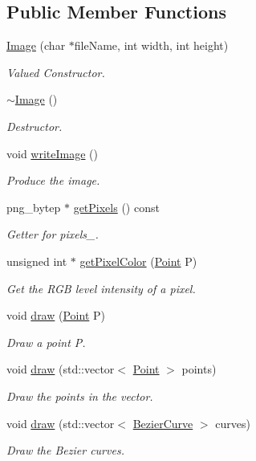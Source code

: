 \subsection*{Public Member Functions}
\begin{DoxyCompactItemize}
\item 
\mbox{\hyperlink{class_image_a742d8eafbcfe7e0b66a145bac182adb3}{Image}} (char $\ast$file\+Name, int width, int height)
\begin{DoxyCompactList}\small\item\em Valued Constructor. \end{DoxyCompactList}\item 
\mbox{\hyperlink{class_image_a0294f63700543e11c0f0da85601c7ae5}{$\sim$\+Image}} ()
\begin{DoxyCompactList}\small\item\em Destructor. \end{DoxyCompactList}\item 
void \mbox{\hyperlink{class_image_ac34bdffd357a50025e6a72deb02596b5}{write\+Image}} ()
\begin{DoxyCompactList}\small\item\em Produce the image. \end{DoxyCompactList}\item 
png\+\_\+bytep $\ast$ \mbox{\hyperlink{class_image_a434149170df3e6fad24cc123c8ff029d}{get\+Pixels}} () const
\begin{DoxyCompactList}\small\item\em Getter for pixels\+\_\+. \end{DoxyCompactList}\item 
unsigned int $\ast$ \mbox{\hyperlink{class_image_adb23176701dae47479d4919f55f3aec5}{get\+Pixel\+Color}} (\mbox{\hyperlink{class_point}{Point}} P)
\begin{DoxyCompactList}\small\item\em Get the R\+GB level intensity of a pixel. \end{DoxyCompactList}\item 
void \mbox{\hyperlink{class_image_a8d162f3cab956131d58708c09aa560b0}{draw}} (\mbox{\hyperlink{class_point}{Point}} P)
\begin{DoxyCompactList}\small\item\em Draw a point P. \end{DoxyCompactList}\item 
void \mbox{\hyperlink{class_image_aecc7a0365eb204dba714a71bcb86361d}{draw}} (std\+::vector$<$ \mbox{\hyperlink{class_point}{Point}} $>$ points)
\begin{DoxyCompactList}\small\item\em Draw the points in the vector. \end{DoxyCompactList}\item 
void \mbox{\hyperlink{class_image_a6349aee8ec05bbecb9b6e6430de07d7c}{draw}} (std\+::vector$<$ \mbox{\hyperlink{class_bezier_curve}{Bezier\+Curve}} $>$ curves)
\begin{DoxyCompactList}\small\item\em Draw the Bezier curves. \end{DoxyCompactList}\end{DoxyCompactItemize}
